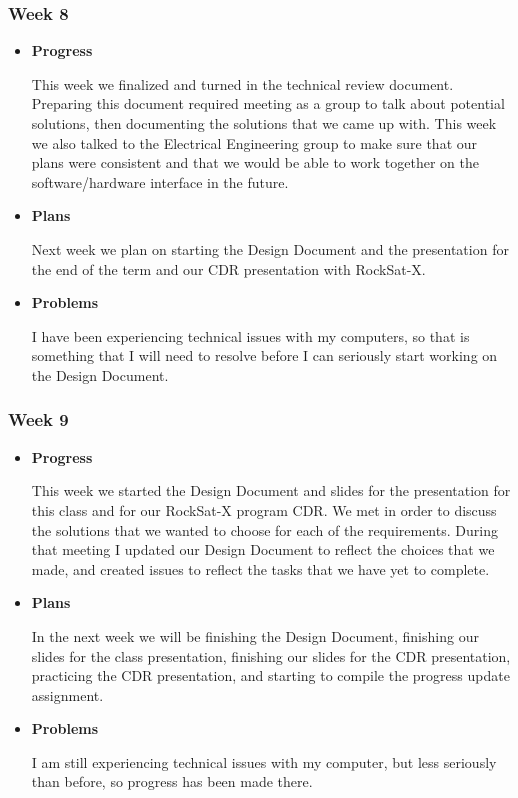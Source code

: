 \subsubsection{Week 8}
\begin{itemize}
\item{
\textbf{Progress}

This week we finalized and turned in the technical review document. Preparing this document required meeting as a group to talk about potential solutions, then documenting the solutions that we came up with. This week we also talked to the Electrical Engineering group to make sure that our plans were consistent and that we would be able to work together on the software/hardware interface in the future.
}
\item{
\textbf{Plans}

Next week we plan on starting the Design Document and the presentation for the end of the term and our CDR presentation with RockSat-X.
}
\item{
\textbf{Problems}

I have been experiencing technical issues with my computers, so that is something that I will need to resolve before I can seriously start working on the Design Document.
}
\end{itemize}

\subsubsection{Week 9}
\begin{itemize}
\item{
\textbf{Progress}

This week we started the Design Document and slides for the presentation for this class and for our RockSat-X program CDR. We met in order to discuss the solutions that we wanted to choose for each of the requirements. During that meeting I updated our Design Document to reflect the choices that we made, and created issues to reflect the tasks that we have yet to complete.
}
\item{
\textbf{Plans}

In the next week we will be finishing the Design Document, finishing our slides for the class presentation, finishing our slides for the CDR presentation, practicing the CDR presentation, and starting to compile the progress update assignment.
}
\item{
\textbf{Problems}

I am still experiencing technical issues with my computer, but less seriously than before, so progress has been made there.
}
\end{itemize}

